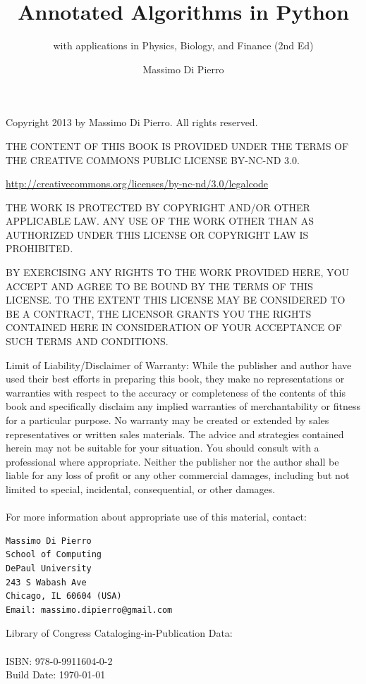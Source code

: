\documentclass[justified,sixbynine]{tufte-book}
\title{\LARGE Annotated Algorithms in Python}
\subtitle{with applications in Physics, Biology, and Finance (2nd Ed)}
\author{Massimo Di Pierro}
\theoremstyle{plain}%
\theoremstyle{definition}
\theoremstyle{remark}
\begin{document}
\frontmatter

\maketitle

\thispagestyle{empty}
\setlength{\parindent}{0pt}
\setlength{\parskip}{2mm}
{\footnotesize
\vskip 1in
Copyright 2013 by Massimo Di Pierro. All rights reserved.
\vskip 1cm

THE CONTENT OF THIS BOOK IS PROVIDED UNDER THE TERMS OF THE CREATIVE COMMONS PUBLIC LICENSE BY-NC-ND 3.0.

\url{http://creativecommons.org/licenses/by-nc-nd/3.0/legalcode}

THE WORK IS PROTECTED BY COPYRIGHT AND/OR OTHER APPLICABLE LAW. ANY USE OF THE WORK OTHER THAN AS AUTHORIZED UNDER THIS LICENSE OR COPYRIGHT LAW IS PROHIBITED.

BY EXERCISING ANY RIGHTS TO THE WORK PROVIDED HERE, YOU ACCEPT AND AGREE TO BE BOUND BY THE TERMS OF THIS LICENSE. TO THE EXTENT THIS LICENSE MAY BE CONSIDERED TO BE A CONTRACT, THE LICENSOR GRANTS YOU THE RIGHTS CONTAINED HERE IN CONSIDERATION OF YOUR ACCEPTANCE OF SUCH TERMS AND CONDITIONS.

Limit of Liability/Disclaimer of Warranty: While the publisher and
author have used their best efforts in preparing this book, they
make no representations or warranties with respect to the accuracy
or completeness of the contents of this book and specifically
disclaim any implied warranties of merchantability or fitness for a
particular purpose.  No warranty may be created or extended by
sales representatives or written sales materials.
The advice and strategies contained herein may not be
suitable for your situation. You should consult with a professional
where appropriate.  Neither the publisher nor the author shall be liable
for any loss of profit or any other commercial damages, including
but not limited to special, incidental, consequential, or other damages. \\ \\

For more information about appropriate use of this material, contact:

\begin{verbatim}
Massimo Di Pierro
School of Computing
DePaul University
243 S Wabash Ave
Chicago, IL 60604 (USA)
Email: massimo.dipierro@gmail.com
\end{verbatim}

Library of Congress Cataloging-in-Publication Data: \\ \\
ISBN: 978-0-9911604-0-2 \\
Build Date: \today
}
\end{document}
